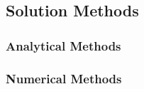 

\subsection{Solution Methods}


\subsubsection{Analytical Methods}


\subsubsection{Numerical Methods}




\begin{comment}


https://en.wikipedia.org/wiki/Fokker%
https://en.wikipedia.org/wiki/Convection%
https://en.wikipedia.org/wiki/Klein%
https://en.wikipedia.org/wiki/Master_equation





https://www.youtube.com/watch?v=UvP5OM2Ccak  Math and Metaphysics of Waves



https://en.wikipedia.org/wiki/Autowave

https://en.wikipedia.org/wiki/Hodgkin%


\end{comment}